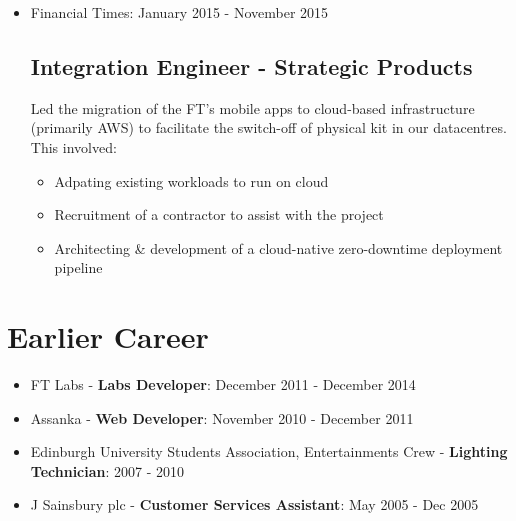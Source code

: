 \documentclass[a4paper]{article}
\newenvironment{detail}{\begin{adjustwidth}{10pt}{}}{\end{adjustwidth}}
\begin{document}
\begin{itemize}
\item Financial Times: January 2015 - November 2015
\subsection*{Integration Engineer - Strategic Products}
\begin{detail}
Led the migration of the FT's mobile apps to cloud-based infrastructure (primarily AWS) to facilitate the switch-off of physical kit in our datacentres.  This involved:
\begin{itemize}
	\item Adpating existing workloads to run on cloud
	\item Recruitment of a contractor to assist with the project
	\item Architecting \& development of a cloud-native zero-downtime deployment pipeline
\end{itemize}
\end{detail}

\end{itemize}

\section*{Earlier Career}
\begin{itemize}

\item FT Labs - {\bf Labs Developer}: December 2011 - December 2014
\item Assanka - {\bf Web Developer}: November 2010 - December 2011
\item Edinburgh University Students Association, Entertainments Crew - {\bf Lighting Technician}: 2007 - 2010
\item J Sainsbury plc - {\bf Customer Services Assistant}: May 2005 - Dec 2005

\end{itemize}
\end{document}
